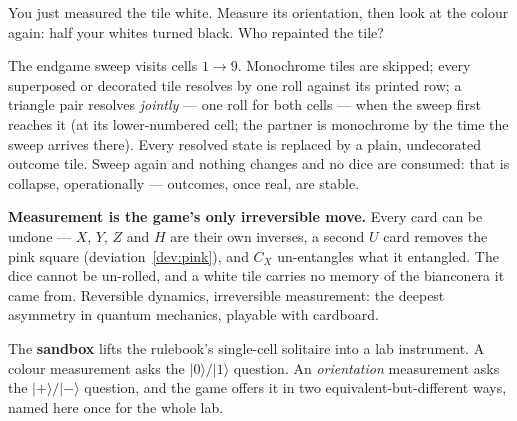\documentclass[a4paper,11pt]{article}
\providecommand{\ket}[1]{|#1\rangle}
\begin{document}
\begin{questionbox}
You just measured the tile white. Measure its orientation, then look at the colour
again: half your whites turned black. Who repainted the tile?
\end{questionbox}

The endgame sweep visits cells $1 \to 9$. Monochrome tiles are skipped; every superposed
or decorated tile resolves by one roll against its printed row; a triangle pair resolves
\emph{jointly} --- one roll for both cells --- when the sweep first reaches it (at its
lower-numbered cell; the partner is monochrome by the time the sweep arrives there).
Every resolved state is replaced by a plain, undecorated outcome tile. Sweep again and
nothing changes and no dice are consumed: that is collapse, operationally --- outcomes,
once real, are stable.

\begin{shockbox}
\textbf{Measurement is the game's only irreversible move.} Every card can be undone
--- $X$, $Y$, $Z$ and $H$ are their own inverses, a second $U$ card removes the pink square
(deviation~\ref{dev:pink}), and $C_X$ un-entangles what it entangled. The dice cannot be un-rolled, and a white tile carries no memory of
the bianconera it came from. Reversible dynamics, irreversible measurement: the deepest
asymmetry in quantum mechanics, playable with cardboard.
\end{shockbox}

The \textbf{sandbox} lifts the rulebook's single-cell solitaire into a lab instrument.
A colour measurement asks the $\ket{0}/\ket{1}$ question. An \emph{orientation}
measurement asks the $\ket{+}/\ket{-}$ question, and the game offers it in two
equivalent-but-different ways, named here once for the whole lab.
\end{document}
